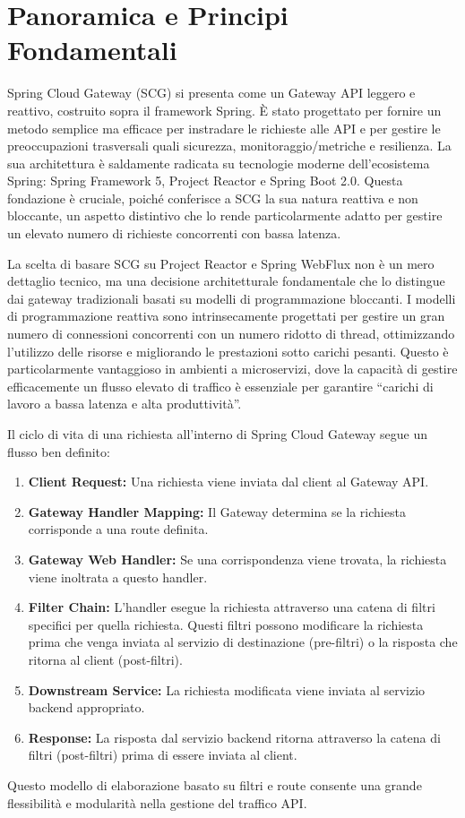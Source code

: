 \section{Panoramica e Principi Fondamentali}

Spring Cloud Gateway (SCG) si presenta come un Gateway API leggero e reattivo, costruito sopra il framework Spring. È stato progettato per fornire un metodo semplice ma efficace per instradare le richieste alle API e per gestire le preoccupazioni trasversali quali sicurezza, monitoraggio/metriche e resilienza. La sua architettura è saldamente radicata su tecnologie moderne dell'ecosistema Spring: Spring Framework 5, Project Reactor e Spring Boot 2.0. Questa fondazione è cruciale, poiché conferisce a SCG la sua natura reattiva e non bloccante, un aspetto distintivo che lo rende particolarmente adatto per gestire un elevato numero di richieste concorrenti con bassa latenza.

La scelta di basare SCG su Project Reactor e Spring WebFlux non è un mero dettaglio tecnico, ma una decisione architetturale fondamentale che lo distingue dai gateway tradizionali basati su modelli di programmazione bloccanti. I modelli di programmazione reattiva sono intrinsecamente progettati per gestire un gran numero di connessioni concorrenti con un numero ridotto di thread, ottimizzando l'utilizzo delle risorse e migliorando le prestazioni sotto carichi pesanti. Questo è particolarmente vantaggioso in ambienti a microservizi, dove la capacità di gestire efficacemente un flusso elevato di traffico è essenziale per garantire \enquote{carichi di lavoro a bassa latenza e alta produttività}.

Il ciclo di vita di una richiesta all'interno di Spring Cloud Gateway segue un flusso ben definito:
\begin{enumerate}[label=\arabic*.]
    \item \textbf{Client Request:} Una richiesta viene inviata dal client al Gateway API.
    \item \textbf{Gateway Handler Mapping:} Il Gateway determina se la richiesta corrisponde a una route definita.
    \item \textbf{Gateway Web Handler:} Se una corrispondenza viene trovata, la richiesta viene inoltrata a questo handler.
    \item \textbf{Filter Chain:} L'handler esegue la richiesta attraverso una catena di filtri specifici per quella richiesta. Questi filtri possono modificare la richiesta prima che venga inviata al servizio di destinazione (pre-filtri) o la risposta che ritorna al client (post-filtri).
    \item \textbf{Downstream Service:} La richiesta modificata viene inviata al servizio backend appropriato.
    \item \textbf{Response:} La risposta dal servizio backend ritorna attraverso la catena di filtri (post-filtri) prima di essere inviata al client.
\end{enumerate}
Questo modello di elaborazione basato su filtri e route consente una grande flessibilità e modularità nella gestione del traffico API.

